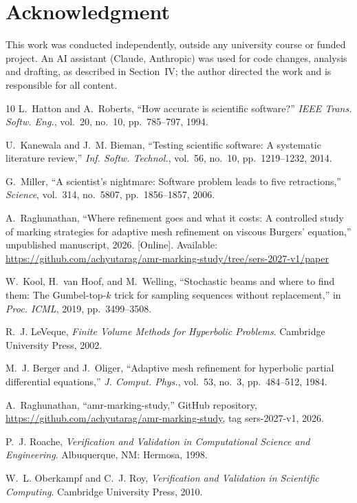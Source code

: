\documentclass[conference]{IEEEtran}
\begin{document}
\section*{Acknowledgment}
This work was conducted independently, outside any university course or
funded project. An AI assistant (Claude, Anthropic) was used for code
changes, analysis and drafting, as described in Section~IV; the author
directed the work and is responsible for all content.

\begin{thebibliography}{10}
L.~Hatton and A.~Roberts, ``How accurate is scientific software?''
\emph{IEEE Trans. Softw. Eng.}, vol.~20, no.~10, pp.~785--797, 1994.

U.~Kanewala and J.~M. Bieman, ``Testing scientific software: A systematic
literature review,'' \emph{Inf. Softw. Technol.}, vol.~56, no.~10,
pp.~1219--1232, 2014.

G.~Miller, ``A scientist's nightmare: Software problem leads to five
retractions,'' \emph{Science}, vol.~314, no.~5807, pp.~1856--1857, 2006.

A.~Raghunathan, ``Where refinement goes and what it costs: A controlled
study of marking strategies for adaptive mesh refinement on viscous
Burgers' equation,'' unpublished manuscript, 2026. [Online]. Available:
\url{https://github.com/achyutarag/amr-marking-study/tree/sers-2027-v1/paper}

W.~Kool, H.~van Hoof, and M.~Welling, ``Stochastic beams and where to find
them: The Gumbel-top-$k$ trick for sampling sequences without replacement,''
in \emph{Proc. ICML}, 2019, pp.~3499--3508.

R.~J. LeVeque, \emph{Finite Volume Methods for Hyperbolic Problems}.
Cambridge University Press, 2002.

M.~J. Berger and J.~Oliger, ``Adaptive mesh refinement for hyperbolic
partial differential equations,'' \emph{J. Comput. Phys.}, vol.~53, no.~3,
pp.~484--512, 1984.

A.~Raghunathan, ``amr-marking-study,'' GitHub repository,
\url{https://github.com/achyutarag/amr-marking-study}, tag sers-2027-v1, 2026.

P.~J. Roache, \emph{Verification and Validation in Computational Science
and Engineering}. Albuquerque, NM: Hermosa, 1998.

W.~L. Oberkampf and C.~J. Roy, \emph{Verification and Validation in
Scientific Computing}. Cambridge University Press, 2010.
\end{thebibliography}
\end{document}

